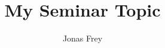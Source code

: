 \documentclass[twoside, english]{sdqseminar}
\author{Jonas Frey}
\title{My Seminar Topic}
\begin{document}
\setpdf

\maketitle

 

\begin{abstract}

\end{abstract}








\printbibliography[heading=bibintoc]
\end{document}
